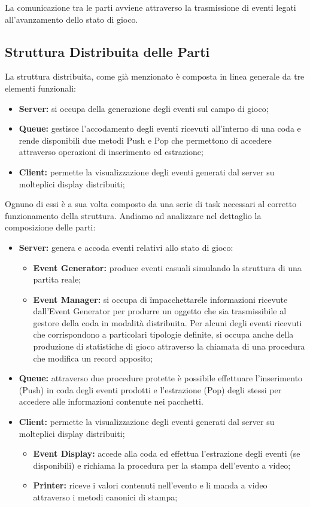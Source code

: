 \documentclass[aps,letterpaper,10pt]{article}
\begin{document}
La comunicazione tra le parti avviene attraverso la trasmissione di eventi legati all'avanzamento dello stato di gioco. 

\subsection{Struttura Distribuita delle Parti}

La struttura distribuita, come gi\`a menzionato \`e composta in linea generale da tre elementi funzionali:

\begin{itemize}
	\item \textbf{Server:} si occupa della generazione degli eventi sul campo di gioco;
	\item \textbf{Queue:} gestisce l'accodamento degli eventi ricevuti all'interno di una coda e rende disponibili due metodi Push e Pop che permettono di accedere attraverso operazioni di inserimento ed estrazione;
	\item \textbf{Client:} permette la visualizzazione degli eventi generati dal server su molteplici display distribuiti;
\end{itemize}

Ognuno di essi \`e a sua volta composto da una serie di task necessari al corretto funzionamento della struttura. Andiamo ad analizzare nel dettaglio la composizione delle parti:

\begin{itemize}
	\item \textbf{Server:} genera e accoda eventi relativi allo stato di gioco:
		\begin{itemize}
			\item \textbf{Event Generator:} produce eventi casuali simulando la struttura di una partita reale;
			\item \textbf{Event Manager:} si occupa di \"impacchettare\" le informazioni ricevute dall'Event Generator per produrre un oggetto che sia trasmissibile al gestore della coda in modalit\`a distribuita. Per alcuni degli eventi ricevuti che corrispondono a particolari tipologie definite, si occupa anche della produzione di statistiche di gioco attraverso la chiamata di una procedura che modifica un record apposito;
		\end{itemize}
	\item \textbf{Queue:} attraverso due procedure protette \`e possibile effettuare l'inserimento (Push) in coda degli eventi prodotti e l'estrazione (Pop) degli stessi per accedere alle informazioni contenute nei pacchetti.
	\item \textbf{Client:} permette la visualizzazione degli eventi generati dal server su molteplici display distribuiti;
		\begin{itemize}
		\item \textbf{Event Display:} accede alla coda ed effettua l'estrazione degli eventi (se disponibili) e richiama la procedura per la stampa dell'evento a video;
		\item \textbf{Printer:} riceve i valori contenuti nell'evento e li manda a video attraverso i metodi canonici di stampa;
		\end{itemize}
\end{itemize}
\end{document}
